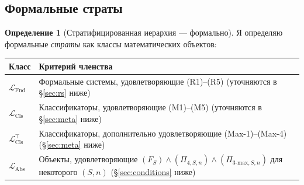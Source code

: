 \documentclass[11pt]{article}
\theoremstyle{plain}
\theoremstyle{definition}
\newtheorem{definition}[theorem]{Определение}
\newcommand{\LFnd}{\mathcal{L}_{\mathrm{Fnd}}}
\newcommand{\LCls}{\mathcal{L}_{\mathrm{Cls}}}
\newcommand{\LClsMax}{\mathcal{L}_{\mathrm{Cls}}^{\top}}
\newcommand{\LAbs}{\mathcal{L}_{\mathrm{Abs}}}
\begin{document}
\subsection{Формальные страты}

\begin{definition}[Стратифицированная иерархия --- формально]\label{def:hierarchy}
Я определяю формальные \emph{страты} как классы математических объектов:

\begin{tabular}{@{}l p{}@{}}
\toprule
Класс & Критерий членства \\ \midrule
$\LFnd$ & Формальные системы, удовлетворяющие (R1)--(R5) (уточняются в \S\ref{sec:rs} ниже) \\
$\LCls$ & Классификаторы, удовлетворяющие (M1)--(M5) (уточняются в \S\ref{sec:meta} ниже) \\
$\LClsMax$ & Классификаторы, дополнительно удовлетворяющие (Max-1)--(Max-4) (\S\ref{sec:meta} ниже) \\
$\LAbs$ & Объекты, удовлетворяющие $(F_S) \wedge (\Pi_{4, S, n}) \wedge (\Pi_{3\text{-max}, S, n})$ для некоторого $(S, n)$ (\S\ref{sec:conditions} ниже) \\
\bottomrule
\end{tabular}
\end{definition}
\end{document}
